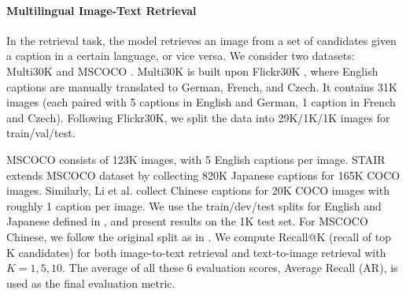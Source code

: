 \documentclass[final]{cvpr}
\newcommand{\luowei}[1]{\textcolor{cyan}{\small{\bf [Luowei: #1 ]}}}
\newcommand{\mingyang}[1]{\textcolor{brown}{\small{\bf [Mingyang: #1 ]}}}
\begin{document}

\paragraph{Multilingual Image-Text Retrieval}
In the retrieval task, the model retrieves an image from a set of candidates given a caption in a certain language, or vice versa. We consider two datasets: Multi30K \cite{multi30k, multi30k_extension_1, multi30k_extension_2} and MSCOCO \cite{MSCOCO, MSCOCO_JA, MSCOCO_ZH}. Multi30K is built upon Flickr30K \cite{Flickr30K}, where English captions are manually translated to German, French, and Czech. It contains 31K images (each paired with 5 captions in English and German, 1 caption in French and Czech). Following Flickr30K\cite{Flickr30K}, we split the data into 29K/1K/1K images for train/val/test. 

MSCOCO\cite{MSCOCO} consists of 123K images, with 5 English captions per image. STAIR \cite{MSCOCO_JA} extends MSCOCO dataset by collecting 820K Japanese captions for 165K COCO images. Similarly, Li et al. \cite{MSCOCO_ZH} collect Chinese captions for 20K COCO images with roughly 1 caption per image. We use the train/dev/test splits for English and Japanese defined in \cite{KarpathyF14}, and present results on the 1K test set. For MSCOCO Chinese, we follow the original split as in \cite{MSCOCO_ZH}. We compute Recall@K (recall of top K candidates)  for both image-to-text retrieval and text-to-image retrieval with $K=1, 5, 10$. The average of all these 6 evaluation scores, Average Recall (AR)\cite{huang2020m3p}, is used as the final evaluation metric. %
\end{document}
